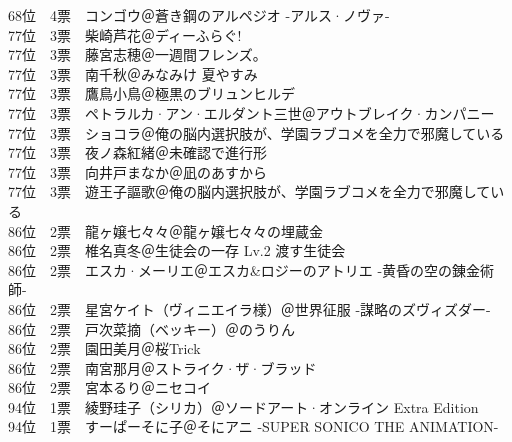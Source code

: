{    68位　4票　コンゴウ＠蒼き鋼のアルペジオ -アルス·ノヴァ-                                              \\
    77位　3票　柴崎芦花＠ディーふらぐ!                                                                    \\
    77位　3票　藤宮志穂＠一週間フレンズ。                                                                 \\
    77位　3票　南千秋＠みなみけ 夏やすみ                                                                  \\
    77位　3票　鷹鳥小鳥＠極黒のブリュンヒルデ                                                             \\
    77位　3票　ペトラルカ·アン·エルダント三世＠アウトブレイク·カンパニー                               \\
    77位　3票　ショコラ＠俺の脳内選択肢が、学園ラブコメを全力で邪魔している                               \\
    77位　3票　夜ノ森紅緒＠未確認で進行形                                                                 \\
    77位　3票　向井戸まなか＠凪のあすから                                                                 \\
    77位　3票　遊王子謳歌＠俺の脳内選択肢が、学園ラブコメを全力で邪魔している                             \\
    86位　2票　龍ヶ嬢七々々＠龍ヶ嬢七々々の埋蔵金                                                         \\
    86位　2票　椎名真冬＠生徒会の一存 Lv.2 渡す生徒会                                                     \\
    86位　2票　エスカ·メーリエ＠エスカ\&ロジーのアトリエ -黄昏の空の錬金術師-                            \\
    86位　2票　星宮ケイト（ヴィニエイラ様）＠世界征服 -謀略のズヴィズダー-                                \\
    86位　2票　戸次菜摘（ベッキー）＠のうりん                                                             \\
    86位　2票　園田美月＠桜Trick                                                                          \\
    86位　2票　南宮那月＠ストライク·ザ·ブラッド                                                         \\
    86位　2票　宮本るり＠ニセコイ                                                                         \\
    94位　1票　綾野珪子（シリカ）＠ソードアート·オンライン Extra Edition                                 \\
    94位　1票　すーぱーそに子＠そにアニ -SUPER SONICO THE ANIMATION-
}

